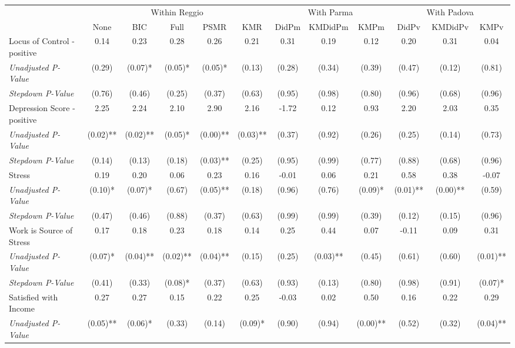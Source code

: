 \begin{tabular}{l c c c c c c c c c c c}
\toprule
& \multicolumn{5}{c}{Within Reggio} & \multicolumn{3}{c}{With Parma} & \multicolumn{3}{c}{With Padova} \\\cmidrule(lr){2-6} \cmidrule(lr){7-9} \cmidrule(lr){10-12}
 & None & BIC & Full & PSMR & KMR & DidPm & KMDidPm & KMPm & DidPv & KMDidPv & KMPv \\
\midrule
Locus of Control - positive & 0.14 & 0.23 & 0.28 & 0.26 & 0.21 & 0.31 & 0.19 & 0.12 & 0.20 & 0.31 & 0.04 \\
\quad \textit{Unadjusted P-Value} & (0.29) & (0.07)* & (0.05)* & (0.05)* & (0.13) & (0.28) & (0.34) & (0.39) & (0.47) & (0.12) & (0.81) \\
\quad \textit{Stepdown P-Value} & (0.76) & (0.46) & (0.25) & (0.37) & (0.63) & (0.95) & (0.98) & (0.80) & (0.96) & (0.68) & (0.96) \\
Depression Score - positive & 2.25 & 2.24 & 2.10 & 2.90 & 2.16 & -1.72 & 0.12 & 0.93 & 2.20 & 2.03 & 0.35 \\
\quad \textit{Unadjusted P-Value} & (0.02)** & (0.02)** & (0.05)* & (0.00)** & (0.03)** & (0.37) & (0.92) & (0.26) & (0.25) & (0.14) & (0.73) \\
\quad \textit{Stepdown P-Value} & (0.14) & (0.13) & (0.18) & (0.03)** & (0.25) & (0.95) & (0.99) & (0.77) & (0.88) & (0.68) & (0.96) \\
Stress & 0.19 & 0.20 & 0.06 & 0.23 & 0.16 & -0.01 & 0.06 & 0.21 & 0.58 & 0.38 & -0.07 \\
\quad \textit{Unadjusted P-Value} & (0.10)* & (0.07)* & (0.67) & (0.05)** & (0.18) & (0.96) & (0.76) & (0.09)* & (0.01)** & (0.00)** & (0.59) \\
\quad \textit{Stepdown P-Value} & (0.47) & (0.46) & (0.88) & (0.37) & (0.63) & (0.99) & (0.99) & (0.39) & (0.12) & (0.15) & (0.96) \\
Work is Source of Stress & 0.17 & 0.18 & 0.23 & 0.18 & 0.14 & 0.25 & 0.44 & 0.07 & -0.11 & 0.09 & 0.31 \\
\quad \textit{Unadjusted P-Value} & (0.07)* & (0.04)** & (0.02)** & (0.04)** & (0.15) & (0.25) & (0.03)** & (0.45) & (0.61) & (0.60) & (0.01)** \\
\quad \textit{Stepdown P-Value} & (0.41) & (0.33) & (0.08)* & (0.37) & (0.63) & (0.93) & (0.13) & (0.80) & (0.98) & (0.91) & (0.07)* \\
Satisfied with Income & 0.27 & 0.27 & 0.15 & 0.22 & 0.25 & -0.03 & 0.02 & 0.50 & 0.16 & 0.22 & 0.29 \\
\quad \textit{Unadjusted P-Value} & (0.05)** & (0.06)* & (0.33) & (0.14) & (0.09)* & (0.90) & (0.94) & (0.00)** & (0.52) & (0.32) & (0.04)** \\

\end{tabular}
